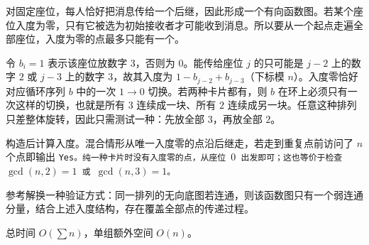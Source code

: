 \Legend
对固定座位，每人恰好把消息传给一个后继，因此形成一个有向函数图。若某个座位入度为零，只有它被选为初始接收者才可能收到消息。所以要从一个起点走遍全部座位，入度为零的点最多只能有一个。

令 $b_i=1$ 表示该座位放数字 $3$，否则为 $0$。能传给座位 $j$ 的只可能是 $j-2$ 上的数字 $2$ 或 $j-3$ 上的数字 $3$，故其入度为 $1-b_{j-2}+b_{j-3}$（下标模 $n$）。入度零恰好对应循环序列 $b$ 中的一次 $1\to0$ 切换。若两种卡片都有，则 $b$ 在环上必须只有一次这样的切换，也就是所有 $3$ 连续成一块、所有 $2$ 连续成另一块。任意这种排列只差整体旋转，因此只需测试一种：先放全部 $3$，再放全部 $2$。

构造后计算入度。混合情形从唯一入度零的点沿后继走，若走到重复点前访问了 $n$ 个点即输出 \tt{Yes}。纯一种卡片时没有入度零的点，从座位 $0$ 出发即可；这也等价于检查 $\gcd(n,2)=1$ 或 $\gcd(n,3)=1$。

参考解换一种验证方式：同一排列的无向底图若连通，则该函数图只有一个弱连通分量，结合上述入度结构，存在覆盖全部点的传递过程。

总时间 $O(\sum n)$，单组额外空间 $O(n)$。
